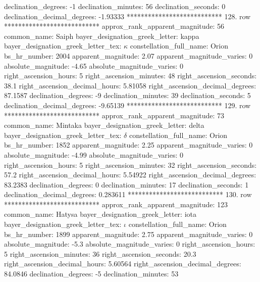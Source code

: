               declination_degrees: -1
               declination_minutes: 56
               declination_seconds: 0
       declination_decimal_degrees: -1.93333
*************************** 128. row ***************************
    approx_rank_apparent_magnitude: 56
                       common_name: Saiph
    bayer_designation_greek_letter: kappa
bayer_designation_greek_letter_tex: $\kappa$
           constellation_full_name: Orion
                      bs_hr_number: 2004
                apparent_magnitude: 2.07
         apparent_magnitude_varies: 0
                absolute_magnitude: -4.65
         absolute_magnitude_varies: 0
             right_ascension_hours: 5
           right_ascension_minutes: 48
           right_ascension_seconds: 38.1
     right_ascension_decimal_hours: 5.81058
   right_ascension_decimal_degrees: 87.1587
               declination_degrees: -9
               declination_minutes: 39
               declination_seconds: 5
       declination_decimal_degrees: -9.65139
*************************** 129. row ***************************
    approx_rank_apparent_magnitude: 73
                       common_name: Mintaka
    bayer_designation_greek_letter: delta
bayer_designation_greek_letter_tex: $\delta$
           constellation_full_name: Orion
                      bs_hr_number: 1852
                apparent_magnitude: 2.25
         apparent_magnitude_varies: 0
                absolute_magnitude: -4.99
         absolute_magnitude_varies: 0
             right_ascension_hours: 5
           right_ascension_minutes: 32
           right_ascension_seconds: 57.2
     right_ascension_decimal_hours: 5.54922
   right_ascension_decimal_degrees: 83.2383
               declination_degrees: 0
               declination_minutes: 17
               declination_seconds: 1
       declination_decimal_degrees: 0.283611
*************************** 130. row ***************************
    approx_rank_apparent_magnitude: 123
                       common_name: Hatysa
    bayer_designation_greek_letter: iota
bayer_designation_greek_letter_tex: $\iota$
           constellation_full_name: Orion
                      bs_hr_number: 1899
                apparent_magnitude: 2.75
         apparent_magnitude_varies: 0
                absolute_magnitude: -5.3
         absolute_magnitude_varies: 0
             right_ascension_hours: 5
           right_ascension_minutes: 36
           right_ascension_seconds: 20.3
     right_ascension_decimal_hours: 5.60564
   right_ascension_decimal_degrees: 84.0846
               declination_degrees: -5
               declination_minutes: 53
